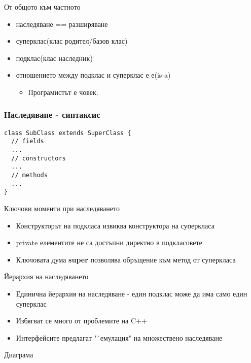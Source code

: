 \documentclass{beamer}
\begin{document}
\begin{frame}{От общото към частното}
  \transdissolve
  \begin{itemize}
  \item наследяване == разширяване
  \item суперклас(клас родител/базов клас)
  \item подклас(клас наследник)
  \item отношението между подклас и суперклас е е(is-a)
    \begin{itemize}
      \item Програмистът е човек.
    \end{itemize}

  \end{itemize}
\end{frame}

\begin{frame}[fragile]
  \frametitle{Наследяване - синтаксис}
  \transdissolve
\begin{lstlisting}
class SubClass extends SuperClass {
  // fields
  ...
  // constructors
  ...
  // methods
  ...
}
\end{lstlisting}
\end{frame}

\begin{frame}{Ключови моменти при наследяването}
  \transdissolve
  \begin{itemize}
  \item Конструкторът на подкласа извиква конструктора на суперкласа
  \item private елементите не са достъпни директно в подкласовете
  \item Ключовата дума \textbf{super} позволява обръщение към метод от
    суперкласа
  \end{itemize}
\end{frame}

\begin{frame}{Йерархия на наследяването}
  \transdissolve
  \begin{itemize}
  \item Единична йерархия на наследяване - един подклас може да има
    само един суперклас
  \item Избягват се много от проблемите на C++
  \item Интерфейсите предлагат "`емулация" на множествено наследяване
  \end{itemize}
\end{frame}


\begin{frame}{Диаграма}
  \transdissolve
  
\end{frame}
\end{document}
